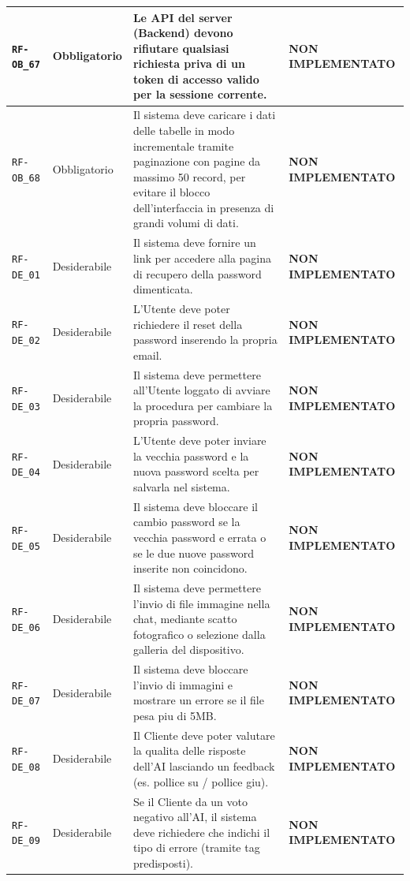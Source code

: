 \documentclass[a4paper, 11pt, oneside]{scrartcl}
\begin{document}
\begin{longtable}{|>{\raggedright\arraybackslash}p{}|>{\raggedright\arraybackslash}p{}|>{\raggedright\arraybackslash}p{}|>{\raggedright\arraybackslash}p{}|}
    \hline
    \texttt{RF-OB\_67} & Obbligatorio & Le API del server (Backend) devono rifiutare qualsiasi richiesta priva di un token di accesso valido per la sessione corrente. & \textbf{NON IMPLEMENTATO} \\
    \hline
    \texttt{RF-OB\_68} & Obbligatorio & Il sistema deve caricare i dati delle tabelle in modo incrementale tramite paginazione con pagine da massimo 50 record, per evitare il blocco dell'interfaccia in presenza di grandi volumi di dati. & \textbf{NON IMPLEMENTATO} \\
    \hline
    \texttt{RF-DE\_01} & Desiderabile & Il sistema deve fornire un link per accedere alla pagina di recupero della password dimenticata. & \textbf{NON IMPLEMENTATO} \\
    \hline
    \texttt{RF-DE\_02} & Desiderabile & L'Utente deve poter richiedere il reset della password inserendo la propria email. & \textbf{NON IMPLEMENTATO} \\
    \hline
    \texttt{RF-DE\_03} & Desiderabile & Il sistema deve permettere all'Utente loggato di avviare la procedura per cambiare la propria password. & \textbf{NON IMPLEMENTATO} \\
    \hline
    \texttt{RF-DE\_04} & Desiderabile & L'Utente deve poter inviare la vecchia password e la nuova password scelta per salvarla nel sistema. & \textbf{NON IMPLEMENTATO} \\
    \hline
    \texttt{RF-DE\_05} & Desiderabile & Il sistema deve bloccare il cambio password se la vecchia password e errata o se le due nuove password inserite non coincidono. & \textbf{NON IMPLEMENTATO} \\
    \hline
    \texttt{RF-DE\_06} & Desiderabile & Il sistema deve permettere l'invio di file immagine nella chat, mediante scatto fotografico o selezione dalla galleria del dispositivo. & \textbf{NON IMPLEMENTATO} \\
    \hline
    \texttt{RF-DE\_07} & Desiderabile & Il sistema deve bloccare l'invio di immagini e mostrare un errore se il file pesa piu di 5MB. & \textbf{NON IMPLEMENTATO} \\
    \hline
    \texttt{RF-DE\_08} & Desiderabile & Il Cliente deve poter valutare la qualita delle risposte dell'AI lasciando un feedback (es. pollice su / pollice giu). & \textbf{NON IMPLEMENTATO} \\
    \hline
    \texttt{RF-DE\_09} & Desiderabile & Se il Cliente da un voto negativo all'AI, il sistema deve richiedere che indichi il tipo di errore (tramite tag predisposti). & \textbf{NON IMPLEMENTATO} \\

\end{longtable}
\end{document}
